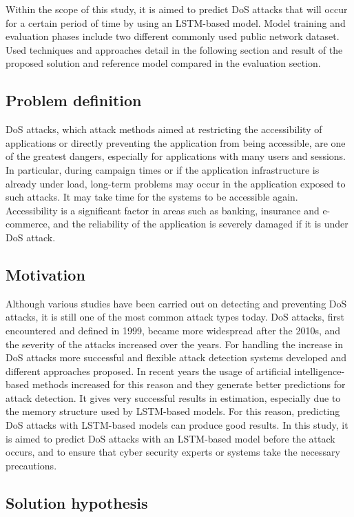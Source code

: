 \documentclass{article}
\begin{document}
Within the scope of this study, it is aimed to predict DoS attacks that will occur for a certain period of time by using an LSTM-based model. Model training and evaluation phases include two different commonly used public network dataset. Used techniques and approaches detail in the following section and result of the proposed solution and reference model compared in the evaluation section. 

\subsection{Problem definition}
DoS attacks, which attack methods aimed at restricting the accessibility of applications or directly preventing the application from being accessible, are one of the greatest dangers, especially for applications with many users and sessions. In particular, during campaign times or if the application infrastructure is already under load, long-term problems may occur in the application exposed to such attacks. It may take time for the systems to be accessible again. Accessibility is a significant factor in areas such as banking, insurance and e-commerce, and the reliability of the application is severely damaged if it is under DoS attack.

\subsection{Motivation}
Although various studies have been carried out on detecting and preventing DoS attacks, it is still one of the most common attack types today. DoS attacks, first encountered and defined in 1999, became more widespread after the 2010s, and the severity of the attacks increased over the years\cite{Rangapur}. For handling the increase in DoS attacks more successful and flexible attack detection systems developed and different approaches proposed. In recent years the usage of artificial intelligence-based methods increased for this reason and they generate better predictions for attack detection. It gives very successful results in estimation, especially due to the memory structure used by LSTM-based models. For this reason, predicting DoS attacks with LSTM-based models can produce good results. In this study, it is aimed to predict DoS attacks with an LSTM-based model before the attack occurs, and to ensure that cyber security experts or systems take the necessary precautions.

\subsection{Solution hypothesis}
\end{document}
